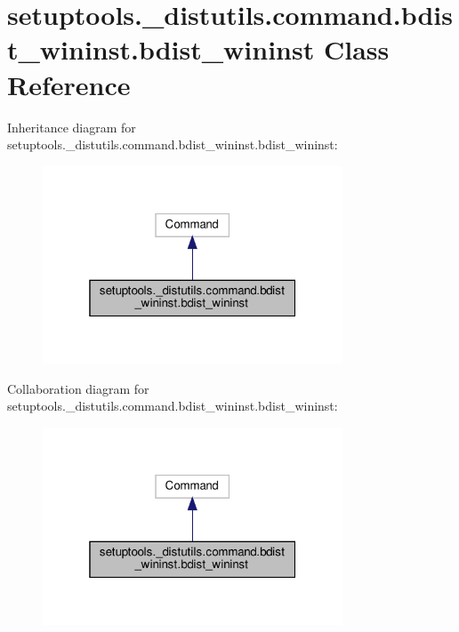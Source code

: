 \hypertarget{classsetuptools_1_1__distutils_1_1command_1_1bdist__wininst_1_1bdist__wininst}{}\section{setuptools.\+\_\+distutils.\+command.\+bdist\+\_\+wininst.\+bdist\+\_\+wininst Class Reference}
\label{classsetuptools_1_1__distutils_1_1command_1_1bdist__wininst_1_1bdist__wininst}


Inheritance diagram for setuptools.\+\_\+distutils.\+command.\+bdist\+\_\+wininst.\+bdist\+\_\+wininst\+:
\nopagebreak
\begin{figure}[H]
\begin{center}
\leavevmode
\includegraphics[width=253pt]{classsetuptools_1_1__distutils_1_1command_1_1bdist__wininst_1_1bdist__wininst__inherit__graph}
\end{center}
\end{figure}


Collaboration diagram for setuptools.\+\_\+distutils.\+command.\+bdist\+\_\+wininst.\+bdist\+\_\+wininst\+:
\nopagebreak
\begin{figure}[H]
\begin{center}
\leavevmode
\includegraphics[width=253pt]{classsetuptools_1_1__distutils_1_1command_1_1bdist__wininst_1_1bdist__wininst__coll__graph}
\end{center}
\end{figure}

